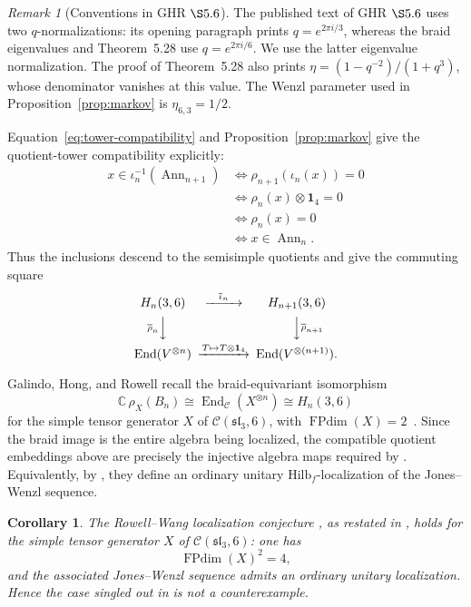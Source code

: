 \documentclass[11pt]{article}
\newtheorem{corollary}[theorem]{Corollary}
\theoremstyle{remark}
\newtheorem{remark}[theorem]{Remark}
\newcommand{\Id}{\mathbf 1}
\newcommand{\End}{\operatorname{End}}
\newcommand{\bbC}{\mathbb C}
\newcommand{\cC}{\mathcal C}
\begin{document}
\begin{remark}[Conventions in GHR \(\S5.6\)]
The published text of GHR \(\S5.6\) uses two \(q\)-normalizations: its opening
paragraph prints \(q=e^{2\pi i/3}\), whereas the braid eigenvalues and
Theorem~5.28 use \(q=e^{2\pi i/6}\).  We use the latter eigenvalue
normalization.  The proof of Theorem~5.28 also prints
\(\eta=(1-q^{-2})/(1+q^3)\), whose denominator vanishes at this value.  The
Wenzl parameter used in Proposition~\ref{prop:markov} is
\(\eta_{6,3}=1/2\).
\end{remark}

Equation~\eqref{eq:tower-compatibility} and Proposition~\ref{prop:markov}
give the quotient-tower compatibility explicitly:
\[
\begin{aligned}
  x\in\iota_n^{-1}(\operatorname{Ann}_{n+1})
  &\Longleftrightarrow \rho_{n+1}(\iota_n(x))=0\\
  &\Longleftrightarrow \rho_n(x)\otimes\Id_4=0\\
  &\Longleftrightarrow \rho_n(x)=0\\
  &\Longleftrightarrow x\in\operatorname{Ann}_n.
\end{aligned}
\]
Thus the inclusions descend to the semisimple quotients and give the
commuting square
\[
\begin{CD}
  H_n(3,6) @>{\overline\iota_n}>> H_{n+1}(3,6)\\
  @V{\overline\rho_n}VV @VV{\overline\rho_{n+1}}V\\
  \End(V^{\otimes n}) @>{T\mapsto T\otimes\Id_4}>>
  \End(V^{\otimes(n+1)}).
\end{CD}
\]

Galindo, Hong, and Rowell recall the braid-equivariant isomorphism
\[
  \bbC\,\rho_X(B_n)
  \cong\End_{\cC}(X^{\otimes n})\cong H_n(3,6)
\]
for the simple tensor generator \(X\) of \(\cC(\mathfrak{sl}_3,6)\), with
\(\operatorname{FPdim}(X)=2\)~\cite[\S5.6]{GHR2013}.  Since the braid image is
the entire algebra being localized, the compatible quotient embeddings above
are precisely the injective algebra maps required by
\cite[Definition~1.3]{GHR2013}.  Equivalently, by
\cite[Proposition~4.12 and Definition~4.13]{GHR2013}, they define an ordinary
unitary \(\mathrm{Hilb}_f\)-localization of the Jones--Wenzl sequence.

\begin{corollary}\label{cor:not-counterexample}
The Rowell--Wang localization conjecture
\cite[Conjecture~3.1, p.~601]{RowellWang2012}, as restated in
\cite[Conjecture~1.5]{GHR2013}, holds for the simple tensor generator \(X\) of
\(\cC(\mathfrak{sl}_3,6)\): one has
\[
  \operatorname{FPdim}(X)^2=4,
\]
and the associated Jones--Wenzl sequence admits an ordinary unitary
localization.  Hence the case singled out in
\cite[Remark~6.2(2)]{GHR2013} is not a counterexample.
\end{corollary}
\end{document}
